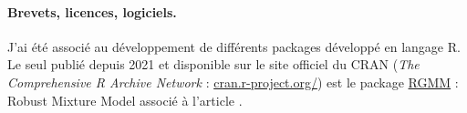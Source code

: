 
\paragraph{Brevets, licences, logiciels.} 
J'ai été associé au développement de différents packages développé en langage R. 
Le seul publié depuis 2021 et disponible sur le site officiel du CRAN ({\sl The Comprehensive R Archive Network} : \url{cran.r-project.org/}) est le package \url{RGMM} : Robust Mixture Model associé à l'article \cite{GoR24}.



